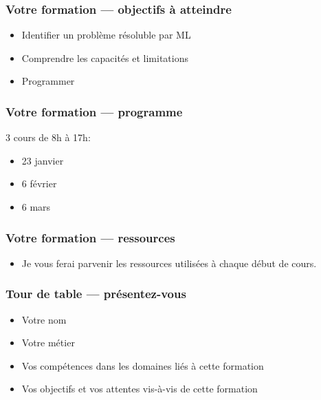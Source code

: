 \documentclass{formation}
\begin{document}
\begin{frame}
  \frametitle{Votre formation — objectifs à atteindre}
  \begin{itemize}
  \item Identifier un problème résoluble par ML
  \item Comprendre les capacités et limitations
  \item Programmer
  \end{itemize}
\end{frame}

\begin{frame}
  \frametitle{Votre formation — programme}
  3 cours de 8h à 17h:
  \begin{itemize}
  \item 23 janvier
  \item 6 février
  \item 6 mars
  \end{itemize}
\end{frame}

\begin{frame}
  \frametitle{Votre formation — ressources}
  \begin{itemize}
    \item Je vous ferai parvenir les ressources utilisées à chaque début de cours.
  \end{itemize}
\end{frame}

\begin{frame}
  \frametitle{Tour de table — présentez-vous}
  \begin{itemize}
  \item Votre nom
  \item Votre métier
  \item Vos compétences dans les domaines liés à cette formation
  \item Vos objectifs et vos attentes vis-à-vis de cette formation
  \end{itemize}
\end{frame}
\end{document}
